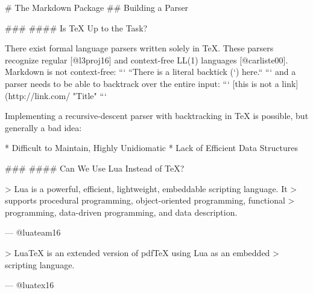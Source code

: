 \documentclass{beamer}
\begin{document}
# The Markdown Package
## Building a Parser

\begin{frame}

### \subsecname
#### Is \TeX{} Up to the Task?

There exist formal language parsers written solely in \TeX. These parsers
recognize regular [@l3proj16] and context-free LL(1) languages [@carliste00].
Markdown is not context-free:
```
``There is a literal backtick (`) here.``
```
and a parser needs to be able to backtrack over the entire input:
```
[this is not a link](http://link.com/ "Title"
```

Implementing a recursive-descent parser with backtracking in \TeX{} is
possible, but generally a bad idea:

  * Difficult to Maintain, Highly Unidiomatic
  * Lack of Efficient Data Structures

\end{frame}
\begin{frame}

### \subsecname
#### Can We Use Lua Instead of \TeX?

> Lua is a powerful, efficient, lightweight, embeddable scripting language. It
> supports procedural programming, object-oriented programming, functional
> programming, data-driven programming, and data description. 

\hfill --- @luateam16
\vfill

> Lua\TeX{} is an extended version of pdf\TeX{} using Lua as an embedded
> scripting language.

\hfill --- @luatex16

\end{frame}
\end{document}
